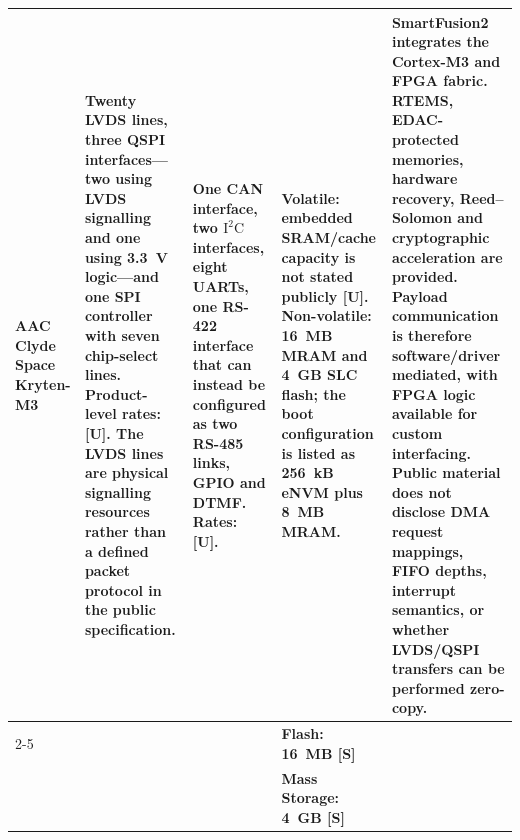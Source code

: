 \documentclass[10pt]{../datasheet}
\let\cite\citep
\begin{document}
\begin{landscape}
\begin{longtable}{|p{3.2cm}|p{4.5cm}|p{4.5cm}|p{4.5cm}|p{5.5cm}|}
    AAC Clyde Space Kryten-M3 \cite{aac_kryten_m3_ds}                  &
    Twenty LVDS lines, three QSPI interfaces---two using LVDS signalling and one
    using 3.3~V logic---and one SPI controller with seven chip-select lines.
    Product-level rates: [U]. The LVDS lines are physical signalling resources
    rather than a defined packet protocol in the public specification.
                                                                       & One CAN interface, two $\text{I}^2\text{C}$ interfaces, eight UARTs, one
    RS-422 interface that can instead be configured as two RS-485 links, GPIO
    and DTMF. Rates: [U].                                              & Volatile: embedded SRAM/cache capacity is not
    stated publicly [U]. Non-volatile: 16~MB MRAM and 4~GB SLC flash; the boot
    configuration is listed as 256~kB eNVM plus 8~MB MRAM.
                                                                       & SmartFusion2 integrates the Cortex-M3 and FPGA fabric. RTEMS,
    EDAC-protected memories, hardware recovery, Reed--Solomon and cryptographic
    acceleration are provided. Payload communication is therefore
    software/driver mediated, with FPGA logic available for custom interfacing.
    Public material does not disclose DMA request mappings, FIFO depths,
    interrupt semantics, or whether LVDS/QSPI transfers can be performed
    zero-copy.
    \\
    \cline{2-5}
                                                                       &                                                                            &                                                  & \textbf{Flash: 16~MB [S]}                 & \\
                                                                       &                                                                            &                                                  & \textbf{Mass Storage: 4~GB [S]}           & \\ \hline\hline


\end{longtable}
\end{landscape}
\end{document}
